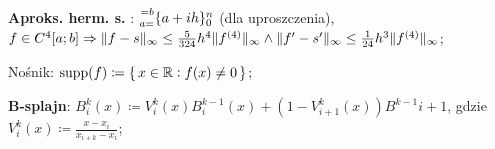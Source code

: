 \entry
\textbf{Aproks. herm. s. \mancube}:
$\ipoints[0][n][a=][=b]{a+ih}$
(dla uproszczenia),
$
f\in C^{4}[a;b]
\Rightarrow
\|f-s\|_\infty \leq \frac{5}{324} h^4 \|f^{(4)}\|_\infty
\wedge
\|f'-s'\|_\infty \leq \frac{1}{24} h^3 \|f^{(4)}\|_\infty
$;


\entry
Nośnik:
$\mathrm{supp}(f) \coloneqq \set{x \in \mathbb{R}: f(x) \neq 0}$;

\entry
\textbf{B-splajn}:
$B_i^k(x) \coloneqq V_i^k(x) B_i^{k-1}(x) + (1 - V^k_{i+1}(x)) B^{k-1}{i+1}$,
gdzie
$V_i^k(x) \coloneqq \frac{x-x_i}{x_{i+k} - x_i}$;
